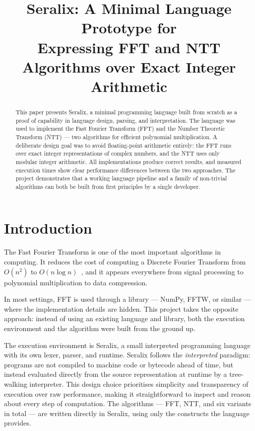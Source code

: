 \documentclass[conference]{IEEEtran}
\title{Seralix: A Minimal Language Prototype for\\
Expressing FFT and NTT Algorithms over Exact Integer Arithmetic}
\author{
\IEEEauthorblockN{David Mateo Barbosa Monsalve}
\IEEEauthorblockA{
Universidad de los Andes \\
Systems and Computing Engineering
}
}
\begin{document}
\maketitle

\begin{abstract}
This paper presents Seralix, a minimal programming language built from scratch as a proof of capability in language design, parsing, and interpretation. The language was used to implement the Fast Fourier Transform (FFT) and the Number Theoretic Transform (NTT) — two algorithms for efficient polynomial multiplication. A deliberate design goal was to avoid floating-point arithmetic entirely: the FFT runs over exact integer representations of complex numbers, and the NTT uses only modular integer arithmetic. All implementations produce correct results, and measured execution times show clear performance differences between the two approaches. The project demonstrates that a working language pipeline and a family of non-trivial algorithms can both be built from first principles by a single developer.
\end{abstract}

\section{Introduction}

The Fast Fourier Transform is one of the most important algorithms in computing. It reduces the cost of computing a Discrete Fourier Transform from $O(n^2)$ to $O(n \log n)$~\cite{cooley1965}, and it appears everywhere from signal processing to polynomial multiplication to data compression.

In most settings, FFT is used through a library — NumPy, FFTW, or similar — where the implementation details are hidden. This project takes the opposite approach: instead of using an existing language and library, both the execution environment and the algorithm were built from the ground up.

The execution environment is Seralix, a small interpreted programming language with its own lexer, parser, and runtime. Seralix follows the \textit{interpreted} paradigm: programs are not compiled to machine code or bytecode ahead of time, but instead evaluated directly from the source representation at runtime by a tree-walking interpreter. This design choice prioritises simplicity and transparency of execution over raw performance, making it straightforward to inspect and reason about every step of computation. The algorithms — FFT, NTT, and six variants in total — are written directly in Seralix, using only the constructs the language provides.
\end{document}
